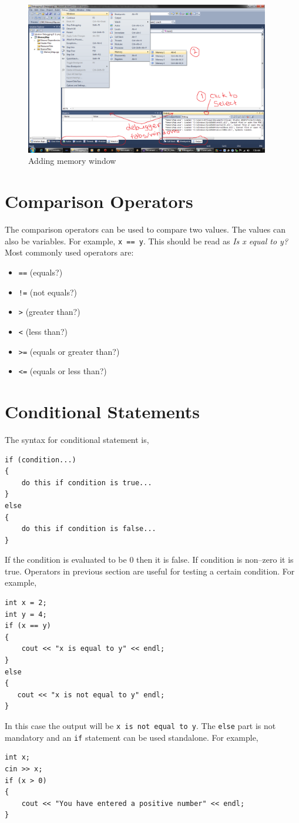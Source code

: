 \documentclass[12pt,a4paper]{article}
\begin{document}
\begin{figure}[H]
\centering
\label{Adding-Memory-Window}
\includegraphics[width=0.95\textwidth]{AddingMemoryWindow.png}
\caption{Adding memory window}
\end{figure}
\section{Comparison Operators}
The comparison operators can be used to compare two values. The values can also be variables.  For example, \verb|x == y|. This should be read as \textit{Is x equal to y?} Most commonly used operators are:
\begin{itemize}
\item \verb|==| (equals?)
\item \verb|!=| (not equals?)
\item \verb|>| (greater than?)
\item \verb|<| (less than?)
\item \verb|>=| (equals or greater than?)
\item \verb|<=| (equals or less than?)
\end{itemize}

\section{Conditional Statements}
The syntax for conditional statement is,
\begin{lstlisting}
if (condition...)
{
    do this if condition is true...
}
else
{
    do this if condition is false...
}
\end{lstlisting}
If the condition is evaluated to be 0 then it is false. If condition is non--zero it is true.
Operators in previous section are useful for testing a certain condition. For example,
\begin{lstlisting}
int x = 2;
int y = 4;
if (x == y)
{
    cout << "x is equal to y" << endl;
}
else
{
   cout << "x is not equal to y" endl;
}
\end{lstlisting}
In this case the output will be \verb|x is not equal to y|. The \verb|else| part is not mandatory and an \verb|if| statement can be used standalone. For example,
\begin{lstlisting}
int x;
cin >> x;
if (x > 0)
{
    cout << "You have entered a positive number" << endl;
}
\end{lstlisting}
\end{document}
